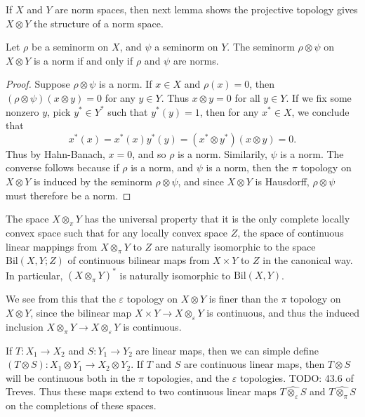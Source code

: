 If $X$ and $Y$ are norm spaces, then next lemma shows the projective topology gives $X \otimes Y$ the structure of a norm space.

\begin{lemma}
    Let $\rho$ be a seminorm on $X$, and $\psi$ a seminorm on $Y$. The seminorm $\rho \otimes \psi$ on $X \otimes Y$ is a norm if and only if $\rho$ and $\psi$ are norms.
\end{lemma}
\begin{proof}
    Suppose $\rho \otimes \psi$ is a norm. If $x \in X$ and $\rho(x) = 0$, then $(\rho \otimes \psi)(x \otimes y) = 0$ for any $y \in Y$. Thus $x \otimes y = 0$ for all $y \in Y$. If we fix some nonzero $y$, pick $y^* \in Y^*$ such that $y^*(y) = 1$, then for any $x^* \in X$, we conclude that
    \[ x^*(x) = x^*(x) y^*(y) = (x^* \otimes y^*)(x \otimes y) = 0. \]
    Thus by Hahn-Banach, $x = 0$, and so $\rho$ is a norm. Similarily, $\psi$ is a norm. The converse follows because if $\rho$ is a norm, and $\psi$ is a norm, then the $\pi$ topology on $X \otimes Y$ is induced by the seminorm $\rho \otimes \psi$, and since $X \otimes Y$ is Hausdorff, $\rho \otimes \psi$ must therefore be a norm.
\end{proof}

The space $X \otimes_\pi Y$ has the universal property that it is the only complete locally convex space such that for any locally convex space $Z$, the space of continuous linear mappings from $X \otimes_\pi Y$ to $Z$ are naturally isomorphic to the space $\text{Bil}(X,Y;Z)$ of continuous bilinear maps from $X \times Y$ to $Z$ in the canonical way. In particular, $(X \otimes_\pi Y)^*$ is naturally isomorphic to $\text{Bil}(X,Y)$.

\begin{remark}
    We see from this that the $\varepsilon$ topology on $X \otimes Y$ is finer than the $\pi$ topology on$ X \otimes Y$, since the bilinear map $X \times Y \to X \otimes_\varepsilon Y$ is continuous, and thus the induced inclusion $X \otimes_\pi Y \to X \otimes_\varepsilon Y$ is continuous.
\end{remark}

If $T: X_1 \to X_2$ and $S: Y_1 \to Y_2$ are linear maps, then we can simple define $(T \otimes S): X_1 \otimes Y_1 \to X_2 \otimes Y_2$. If $T$ and $S$ are continuous linear maps, then $T \otimes S$ will be continuous both in the $\pi$ topologies, and the $\varepsilon$ topologies. TODO: 43.6 of Treves. Thus these maps extend to two continuous linear maps $T \widehat{\otimes_\varepsilon} S$ and $T \widehat{\otimes_\pi} S$ on the completions of these spaces.

